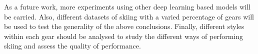 \documentclass[12pt,a4paper]{article}
\begin{document}
As a future work, more experiments using other deep learning based models will be carried. Also, different datasets of skiing with a varied percentage of gears will be used to test the generality of the above conclusions. Finally, different styles within each gear should be analysed to study the different ways of performing skiing and assess the quality of performance.

\nocite{1}
\nocite{*}


\end{document}
